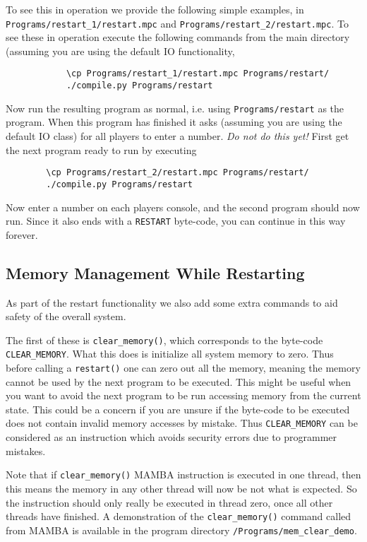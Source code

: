 To see this in operation we provide the following simple
examples, in \verb+Programs/restart_1/restart.mpc+
and \verb+Programs/restart_2/restart.mpc+.
To see these in operation execute the following commands
from the main directory (assuming you are using the
default IO functionality,
\begin{verbatim}
            \cp Programs/restart_1/restart.mpc Programs/restart/
            ./compile.py Programs/restart
\end{verbatim}
Now run the resulting program as normal, i.e. using \verb+Programs/restart+
as the program.
When this program has finished it asks (assuming you are
using the default IO class) for all players to enter
a number. {\em Do not do this yet!}
First get the next program ready to run by executing
\begin{verbatim}
        \cp Programs/restart_2/restart.mpc Programs/restart/
        ./compile.py Programs/restart
\end{verbatim}
Now enter a number on each players console, and 
the second program should now run.
Since it also ends with a \verb+RESTART+ byte-code, you can
continue in this way forever.

\subsection{Memory Management While Restarting}
As part of the restart functionality we also add some extra commands to aid
safety of the overall system.

The first of these is \verb+clear_memory()+, which corresponds to the byte-code
\verb+CLEAR_MEMORY+.
What this does is initialize all system memory to zero. Thus before calling a 
\verb+restart()+ one can zero out all the memory, meaning the memory cannot be
used by the next program to be executed. This might be useful when you want to
avoid the next program to be run accessing memory from the current state. This
could be a concern if you are unsure if the byte-code to be executed does not
contain invalid memory accesses by mistake. Thus \verb+CLEAR_MEMORY+ can be
considered as an instruction which avoids security errors due to programmer
mistakes.

Note that if \verb+clear_memory()+ MAMBA instruction is executed in one thread, 
then this means the memory in any other thread will now be not what is expected. 
So the instruction should only really be executed in thread zero, once all other threads have
finished.
A demonstration of the \verb+clear_memory()+ command called from MAMBA is
available in the program directory \verb+/Programs/mem_clear_demo+.

